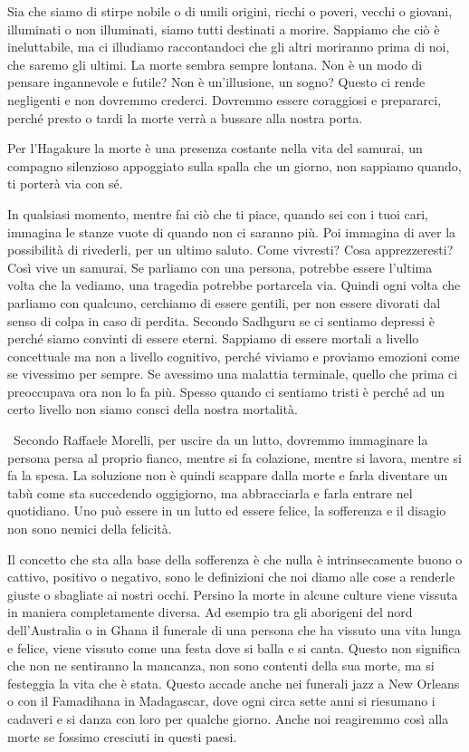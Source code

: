 \documentclass[12pt]{book} %
\begin{document}
Sia che siamo di stirpe nobile o di umili origini, ricchi o poveri, vecchi o giovani, illuminati o non illuminati, siamo
tutti destinati a morire. Sappiamo che ciò è ineluttabile, ma ci illudiamo raccontandoci che gli altri moriranno prima
di noi, che saremo gli ultimi. La morte sembra sempre lontana. Non è un modo di pensare ingannevole e futile? Non è
un'illusione, un sogno? Questo ci rende negligenti e non dovremmo crederci. Dovremmo essere coraggiosi e prepararci,
perché presto o tardi la morte verrà a bussare alla nostra porta.

Per l'Hagakure la morte è una presenza costante nella vita del samurai, un compagno silenzioso
appoggiato sulla spalla che un giorno, non sappiamo quando, ti porterà via con sé. 

In qualsiasi momento, mentre fai ciò che ti piace, quando sei con i tuoi cari, immagina le stanze vuote di quando non ci
saranno più. Poi immagina di aver la possibilità di rivederli, per un ultimo saluto. Come vivresti? Cosa apprezzeresti?
Così vive un samurai. Se parliamo con una persona, potrebbe essere l'ultima volta che la vediamo, una tragedia potrebbe
portarcela via. Quindi ogni volta che parliamo con qualcuno, cerchiamo di essere gentili, per non essere divorati dal
senso di colpa in caso di perdita. Secondo Sadhguru se ci sentiamo depressi è perché siamo convinti di essere eterni.
Sappiamo di essere mortali a livello concettuale ma non a livello cognitivo, perché viviamo e proviamo emozioni come se
vivessimo per sempre. Se avessimo una malattia terminale, quello che prima ci preoccupava ora non lo fa più. Spesso
quando ci sentiamo tristi è perché ad un certo livello non siamo consci della nostra mortalità.

\ Secondo Raffaele Morelli, per uscire da un lutto, dovremmo immaginare la persona persa al proprio fianco, mentre si fa
colazione, mentre si lavora, mentre si fa la spesa. La soluzione non è quindi scappare dalla morte e farla diventare un
tabù come sta succedendo oggigiorno, ma abbracciarla e farla entrare nel quotidiano. Uno può essere in un lutto ed
essere felice, la sofferenza e il disagio non sono nemici della felicità.


\bigskip

Il concetto che sta alla base della sofferenza è che nulla è intrinsecamente buono o cattivo, positivo o negativo, sono
le definizioni che noi diamo alle cose a renderle giuste o sbagliate ai nostri occhi. Persino la morte in alcune
culture viene vissuta in maniera completamente diversa. Ad esempio tra gli aborigeni del nord
dell'Australia o in Ghana il funerale di una persona che ha vissuto una vita lunga e felice, viene
vissuto come una festa dove si balla e si canta. Questo non significa che non ne sentiranno la mancanza, non sono
contenti della sua morte, ma si festeggia la vita che è stata. Questo accade anche nei funerali jazz a New Orleans o
con il Famadihana in Madagascar, dove ogni circa sette anni si riesumano i cadaveri e si danza con loro per qualche
giorno. Anche noi reagiremmo così alla morte se fossimo cresciuti in questi paesi.
\end{document}
